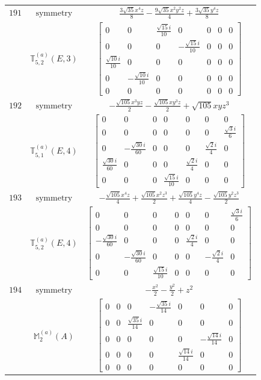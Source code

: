 \documentclass[fleqn,8pt,landscape]{jsarticle}
\begin{document}
\begin{longtable}{ccc}
$ 191 $ & $ \text{symmetry} $ & $ \frac{3 \sqrt{35} x^{4} z}{8} - \frac{9 \sqrt{35} x^{2} y^{2} z}{4} + \frac{3 \sqrt{35} y^{4} z}{8} $ \\
$  $ & $ \mathbb{T}_{5,2}^{(a)}(E,3) $ & $ \begin{bmatrix} 0 & 0 & \frac{\sqrt{15} i}{10} & 0 & 0 & 0 & 0 \\ 0 & 0 & 0 & - \frac{\sqrt{15} i}{10} & 0 & 0 & 0 \\ \frac{\sqrt{10} i}{10} & 0 & 0 & 0 & 0 & 0 & 0 \\ 0 & - \frac{\sqrt{10} i}{10} & 0 & 0 & 0 & 0 & 0 \\ 0 & 0 & 0 & 0 & 0 & 0 & 0 \end{bmatrix} $ \\ \hline
$ 192 $ & $ \text{symmetry} $ & $ - \frac{\sqrt{105} x^{3} y z}{2} - \frac{\sqrt{105} x y^{3} z}{2} + \sqrt{105} x y z^{3} $ \\
$  $ & $ \mathbb{T}_{5,1}^{(a)}(E,4) $ & $ \begin{bmatrix} 0 & 0 & 0 & 0 & 0 & 0 & 0 \\ 0 & 0 & 0 & 0 & 0 & 0 & \frac{\sqrt{3} i}{6} \\ 0 & - \frac{\sqrt{30} i}{60} & 0 & 0 & 0 & \frac{\sqrt{2} i}{4} & 0 \\ \frac{\sqrt{30} i}{60} & 0 & 0 & 0 & \frac{\sqrt{2} i}{4} & 0 & 0 \\ 0 & 0 & 0 & \frac{\sqrt{15} i}{10} & 0 & 0 & 0 \end{bmatrix} $ \\ \hline
$ 193 $ & $ \text{symmetry} $ & $ - \frac{\sqrt{105} x^{4} z}{4} + \frac{\sqrt{105} x^{2} z^{3}}{2} + \frac{\sqrt{105} y^{4} z}{4} - \frac{\sqrt{105} y^{2} z^{3}}{2} $ \\
$  $ & $ \mathbb{T}_{5,2}^{(a)}(E,4) $ & $ \begin{bmatrix} 0 & 0 & 0 & 0 & 0 & 0 & \frac{\sqrt{3} i}{6} \\ 0 & 0 & 0 & 0 & 0 & 0 & 0 \\ - \frac{\sqrt{30} i}{60} & 0 & 0 & 0 & \frac{\sqrt{2} i}{4} & 0 & 0 \\ 0 & - \frac{\sqrt{30} i}{60} & 0 & 0 & 0 & - \frac{\sqrt{2} i}{4} & 0 \\ 0 & 0 & \frac{\sqrt{15} i}{10} & 0 & 0 & 0 & 0 \end{bmatrix} $ \\ \hline
$ 194 $ & $ \text{symmetry} $ & $ - \frac{x^{2}}{2} - \frac{y^{2}}{2} + z^{2} $ \\
$  $ & $ \mathbb{M}_{2}^{(a)}(A) $ & $ \begin{bmatrix} 0 & 0 & 0 & - \frac{\sqrt{35} i}{14} & 0 & 0 & 0 \\ 0 & 0 & \frac{\sqrt{35} i}{14} & 0 & 0 & 0 & 0 \\ 0 & 0 & 0 & 0 & 0 & - \frac{\sqrt{14} i}{14} & 0 \\ 0 & 0 & 0 & 0 & \frac{\sqrt{14} i}{14} & 0 & 0 \\ 0 & 0 & 0 & 0 & 0 & 0 & 0 \end{bmatrix} $ \\ \hline

\end{longtable}
\end{document}

